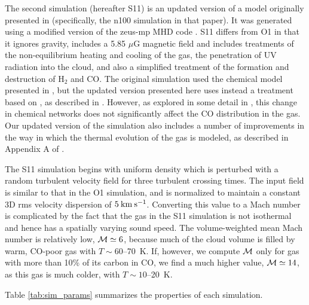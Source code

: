 The second simulation (hereafter S11) is an updated version of a model
 originally presented in \cite{http://adsabs.harvard.edu/abs/2011MNRAS.415.3253S} (specifically, the n100 simulation
 in that paper). It was generated using a modified version of the {\sc zeus-mp}
 MHD code \citep{http://adsabs.harvard.edu/abs/1992ApJS...80..753S,  http://adsabs.harvard.edu/abs/1992ApJS...80..791S, http://adsabs.harvard.edu/abs/2000RMxAC...9...66N, http://adsabs.harvard.edu/abs/2006ApJS..165..188H}.
 S11 differs from O1 in that it ignores gravity, includes a 5.85 $\mu$G
 magnetic field and includes treatments of the non-equilibrium heating and
 cooling of the gas, the penetration of UV radiation into the cloud, and also a
 simplified treatment of the formation and destruction of H$_2$ and CO. The original
 \cite{http://adsabs.harvard.edu/abs/2011MNRAS.415.3253S} simulation used the chemical model presented in
 \cite{http://adsabs.harvard.edu/abs/2010MNRAS.404....2G}, but the updated version presented here uses instead
 a treatment based on \cite{http://adsabs.harvard.edu/abs/1999ApJ...524..923N}, as described in \cite{http://adsabs.harvard.edu/abs/2012MNRAS.421..116G}. However, as explored in some detail in \cite{http://adsabs.harvard.edu/abs/2012MNRAS.421..116G},
 this change in chemical networks does not significantly affect the CO
 distribution in the gas. Our updated version of the \cite{http://adsabs.harvard.edu/abs/2011MNRAS.415.3253S}
 simulation also includes a number of improvements in the way in which the
 thermal evolution of the gas is modeled, as described in Appendix A of
 \cite{http://adsabs.harvard.edu/abs/2012MNRAS.421..116G}.

 The S11 simulation begins with uniform density which is perturbed with
 a random turbulent velocity field for three turbulent crossing times. The
 input field is similar to that in the O1 simulation, and is normalized to
 maintain a constant 3D rms velocity dispersion of $5 \: {\rm km \: s^{-1}}$.
 Converting this value to a Mach number is complicated by the fact that the
 gas in the S11 simulation is not isothermal and hence has a spatially varying
 sound speed. The volume-weighted mean Mach number is relatively low,
 ${\cal M} \simeq 6$, because much of the cloud volume is filled by warm,
 CO-poor gas with $T \sim 60$--70~K. If, however, we compute ${\cal M}$
 only for gas with more than 10\% of its carbon in CO, we find a much higher
 value, ${\cal M} \simeq 14$, as this gas is much colder, with
 $T \sim 10$--20~K.

Table \ref{tab:sim_params} summarizes the properties of each simulation.

